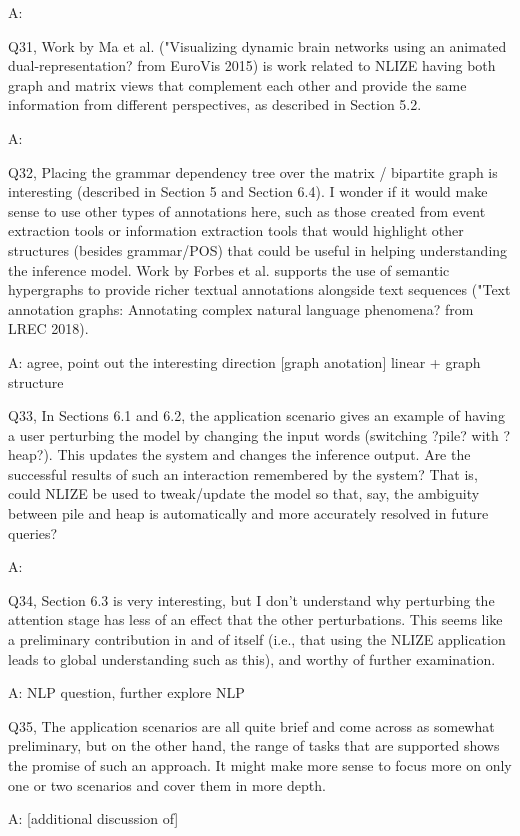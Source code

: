 A:

Q31, Work by Ma et al. ("Visualizing dynamic brain networks using an animated dual-representation? from EuroVis 2015) is work related to NLIZE having both graph and matrix views that complement each other and provide the same information from different perspectives, as described in Section 5.2.

A:

Q32, Placing the grammar dependency tree over the matrix / bipartite graph is interesting (described in Section 5 and Section 6.4). I wonder if it would make sense to use other types of annotations here, such as those created from event extraction tools or information extraction tools that would highlight other structures (besides grammar/POS) that could be useful in helping understanding the inference model. Work by Forbes et al. supports the use of semantic hypergraphs to provide richer textual annotations alongside text sequences ("Text annotation graphs: Annotating complex natural language phenomena? from LREC 2018).

A: agree, point out the interesting direction [graph anotation] linear + graph structure

Q33, In Sections 6.1 and 6.2, the application scenario gives an example of having a user perturbing the model by changing the input words (switching ?pile? with ?heap?). This updates the system and changes the inference output. Are the successful results of such an interaction remembered by the system? That is, could NLIZE be used to tweak/update the model so that, say, the ambiguity between pile and heap is automatically and more accurately resolved in future queries?

A:

Q34, Section 6.3 is very interesting, but I don't understand why perturbing the attention stage has less of an effect that the other perturbations. This seems like a preliminary contribution in and of itself (i.e., that using the NLIZE application leads to global understanding such as this), and worthy of further examination.

A: NLP question, further explore NLP

Q35, The application scenarios are all quite brief and come across as somewhat preliminary, but on the other hand, the range of tasks that are supported shows the promise of such an approach. It might make more sense to focus more on only one or two scenarios and cover them in more depth.

A: [additional discussion of]
